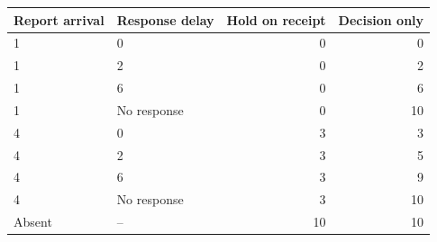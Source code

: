 \begin{tabular}{@{}llrr@{}}\toprule
Report arrival & Response delay & Hold on receipt & Decision only\\\midrule
1 & 0 & 0 & 0\\
1 & 2 & 0 & 2\\
1 & 6 & 0 & 6\\
1 & No response & 0 & 10\\
4 & 0 & 3 & 3\\
4 & 2 & 3 & 5\\
4 & 6 & 3 & 9\\
4 & No response & 3 & 10\\
Absent & -- & 10 & 10\\
\bottomrule\end{tabular}
